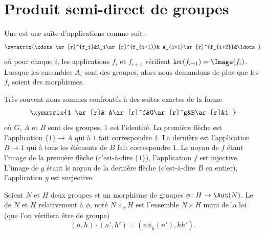 
\section{Produit semi-direct de groupes}

\begin{definition}
	Une  est une suite d'applications comme suit :
	\begin{equation}
		\xymatrix{%
		\cdots \ar[r]^{f_i}&A_i\ar[r]^{f_{i+1}}& A_{i+1}\ar[r]^{f_{i+2}}&\ldots
		}
	\end{equation}
	où pour chaque \( i\), les applications \( f_i\) et \( f_{i+1}\) vérifient \( \ker(f_{i+1})=\Image(f_i)\). Lorsque les ensembles \( A_i\) sont des groupes, alors nous demandons de plus que les \( f_i\) soient des morphismes.
\end{definition}

Très souvent nous sommes confrontés à des suites exactes de la forme
\begin{equation}
	\xymatrix{%
		1 \ar[r]& A\ar[r]^f&G\ar[r]^g&B\ar[r]&1
	}
\end{equation}
où \( G\), \( A\) et \( B\) sont des groupes, \( 1\) est l'identité. La première flèche est l'application \( \{ 1 \}\to A\) qui à \( 1\) fait correspondre \( 1\). La dernière est l'application \( B\to 1\) qui à tous les éléments de \( B\) fait correspondre \( 1\). Le noyau de \( f\) étant l'image de la première flèche (c'est-à-dire \( \{ 1 \}\)), l'application \( f\) est injective. L'image de \( g\) étant le noyau de la dernière flèche (c'est-à-dire \( B\) en entier), l'application \( g\) est surjective.

\begin{definition}     \label{DEFooKWEHooISNQzi}
	Soient \( N\) et \( H\) deux groupes et un morphisme de groupes \( \phi\colon H\to \Aut(N)\). Le  de \( N\) et \( H\) relativement à \( \phi\), noté \( N\times_{\phi}H\) est l'ensemble \( N\times H\) muni de la loi (que l'on vérifiera être de groupe)
	\begin{equation}\label{EqDRgbBI}
		(n,h)\cdot (n',h')=(n\phi_h(n'),hh').
	\end{equation}
\end{definition}


